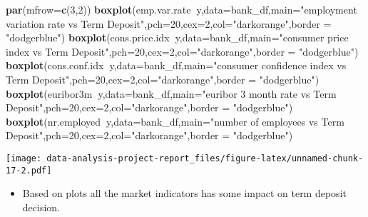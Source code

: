 \documentclass[
]{article}
\newenvironment{Shaded}{\begin{snugshade}}{\end{snugshade}}
\newcommand{\DataTypeTok}[1]{\textcolor[rgb]{0.13,0.29,0.53}{#1}}
\newcommand{\DecValTok}[1]{\textcolor[rgb]{0.00,0.00,0.81}{#1}}
\newcommand{\KeywordTok}[1]{\textcolor[rgb]{0.13,0.29,0.53}{\textbf{#1}}}
\newcommand{\NormalTok}[1]{#1}
\newcommand{\OperatorTok}[1]{\textcolor[rgb]{0.81,0.36,0.00}{\textbf{#1}}}
\newcommand{\StringTok}[1]{\textcolor[rgb]{0.31,0.60,0.02}{#1}}
\providecommand{\tightlist}{%
  \setlength{\itemsep}{0pt}\setlength{\parskip}{0pt}}
\begin{document}
\begin{Shaded}
\begin{Highlighting}[]
\KeywordTok{par}\NormalTok{(}\DataTypeTok{mfrow=}\KeywordTok{c}\NormalTok{(}\DecValTok{3}\NormalTok{,}\DecValTok{2}\NormalTok{))}
\KeywordTok{boxplot}\NormalTok{(emp.var.rate}\OperatorTok{~}\NormalTok{y,}\DataTypeTok{data=}\NormalTok{bank_df,}\DataTypeTok{main=}\StringTok{"employment variation rate  vs Term Deposit"}\NormalTok{,}\DataTypeTok{pch=}\DecValTok{20}\NormalTok{,}\DataTypeTok{cex=}\DecValTok{2}\NormalTok{,}\DataTypeTok{col=}\StringTok{"darkorange"}\NormalTok{,}\DataTypeTok{border =} \StringTok{"dodgerblue"}\NormalTok{)}
\KeywordTok{boxplot}\NormalTok{(cons.price.idx}\OperatorTok{~}\NormalTok{y,}\DataTypeTok{data=}\NormalTok{bank_df,}\DataTypeTok{main=}\StringTok{"consumer price index vs Term Deposit"}\NormalTok{,}\DataTypeTok{pch=}\DecValTok{20}\NormalTok{,}\DataTypeTok{cex=}\DecValTok{2}\NormalTok{,}\DataTypeTok{col=}\StringTok{"darkorange"}\NormalTok{,}\DataTypeTok{border =} \StringTok{"dodgerblue"}\NormalTok{)}
\KeywordTok{boxplot}\NormalTok{(cons.conf.idx}\OperatorTok{~}\NormalTok{y,}\DataTypeTok{data=}\NormalTok{bank_df,}\DataTypeTok{main=}\StringTok{"consumer confidence index  vs Term Deposit"}\NormalTok{,}\DataTypeTok{pch=}\DecValTok{20}\NormalTok{,}\DataTypeTok{cex=}\DecValTok{2}\NormalTok{,}\DataTypeTok{col=}\StringTok{"darkorange"}\NormalTok{,}\DataTypeTok{border =} \StringTok{"dodgerblue"}\NormalTok{)}
\KeywordTok{boxplot}\NormalTok{(euribor3m}\OperatorTok{~}\NormalTok{y,}\DataTypeTok{data=}\NormalTok{bank_df,}\DataTypeTok{main=}\StringTok{"euribor 3 month rate  vs Term Deposit"}\NormalTok{,}\DataTypeTok{pch=}\DecValTok{20}\NormalTok{,}\DataTypeTok{cex=}\DecValTok{2}\NormalTok{,}\DataTypeTok{col=}\StringTok{"darkorange"}\NormalTok{,}\DataTypeTok{border =} \StringTok{"dodgerblue"}\NormalTok{)}
\KeywordTok{boxplot}\NormalTok{(nr.employed}\OperatorTok{~}\NormalTok{y,}\DataTypeTok{data=}\NormalTok{bank_df,}\DataTypeTok{main=}\StringTok{"number of employees vs Term Deposit"}\NormalTok{,}\DataTypeTok{pch=}\DecValTok{20}\NormalTok{,}\DataTypeTok{cex=}\DecValTok{2}\NormalTok{,}\DataTypeTok{col=}\StringTok{"darkorange"}\NormalTok{,}\DataTypeTok{border =} \StringTok{"dodgerblue"}\NormalTok{)}
\end{Highlighting}
\end{Shaded}

\texttt{[image: data-analysis-project-report\_files/figure-latex/unnamed-chunk-17-2.pdf]}

\begin{itemize}
\tightlist
\item
  Based on plots all the market indicators has some impact on term
  deposit decision.
\end{itemize}
\end{document}
